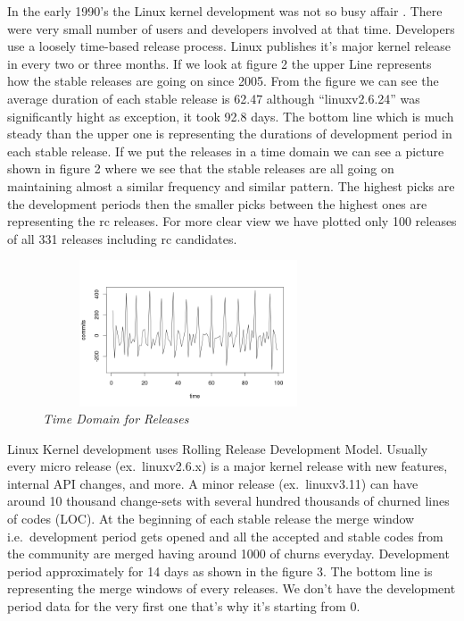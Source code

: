 \documentclass{acm_proc_article-sp}
\begin{document}
In the early 1990's the Linux kernel development was not so busy affair \cite{linux_kernel}. There were very small number of users and developers involved at that time. Developers use a loosely time-based release process. Linux publishes it's major kernel release in every two or three months. If we look at figure 2 the upper Line represents how the stable releases are going on since 2005. From the figure we can see the average duration of each stable release is 62.47 although ``linuxv2.6.24'' was significantly hight as exception, it took 92.8 days. The bottom line which is much steady than the upper one is representing the durations of development period in each stable release. If we put the releases in a time domain we can see a picture shown in figure 2 where we see that the stable releases are all going on maintaining almost a similar frequency and similar pattern. The highest picks are the development periods then the smaller picks between the highest ones are representing the rc releases. For more clear view we have plotted only 100 releases of all 331 releases including rc candidates.

\begin{figure}
\begin{center}
\includegraphics[height=1.7in,width=3.4in]{relTimeDomain100.png}
\caption{\small \sl Time Domain for Releases}
\end{center}
\end{figure}

Linux Kernel development uses Rolling Release Development Model. Usually every micro release (ex.\ linuxv2.6.x) is a major kernel release with new features, internal API changes, and more. A minor release (ex.\ linuxv3.11) can have around 10 thousand change-sets with several hundred thousands of churned lines of codes (LOC). At the beginning of each stable release the merge window i.e.\ development period gets opened and all the accepted and stable codes from the community are merged having around 1000 of churns everyday. Development period approximately for 14 days as shown in the figure 3. The bottom line is representing the merge windows of every releases. We don't have the development period data for the very first one that's why it's starting from 0.
\end{document}

